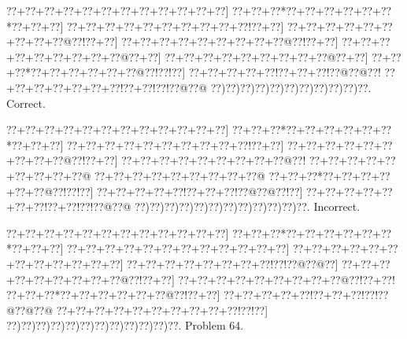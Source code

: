 \documentclass[a5paper]{article}
\begin{document}
\begin{center}
{\goo
\0??+\0??+\0??+\0??+\0??+\0??+\0??+\0??+\0??+\0??+\0??+\0??]
\0??+\0??+\0??*\0??+\0??+\0??+\0??+\0??+\0??*\0??+\0??+\0??]
\0??+\0??+\0??+\0??+\0??+\0??+\0??+\0??+\0??+\0??!\0??+\0??]
\0??+\0??+\0??+\0??+\0??+\0??+\0??+\0??+\0??@\0??!\0??+\0??]
\0??+\0??+\0??+\0??+\0??+\0??+\0??+\0??+\0??@\0??!\0??+\0??]
\0??+\0??+\0??+\0??+\0??+\0??+\0??+\0??+\0??@\0??+\0??]
\0??+\0??+\0??+\0??+\0??+\0??+\0??+\0??+\0??@\0??+\0??]
\0??+\0??+\0??*\0??+\0??+\0??+\0??+\0??+\0??@\0??!\0??!\0??]
\0??+\0??+\0??+\0??+\0??!\0??+\0??+\0??!\0??@\0??@\0??!
\0??+\0??+\0??+\0??+\0??+\0??+\0??!\0??+\0??!\0??!\0??@\0??@
\0??)\0??)\0??)\0??)\0??)\0??)\0??)\0??)\0??)\0??)\0??.
}
Correct. 

\end{center}
\begin{center}
{\goo
\0??+\0??+\0??+\0??+\0??+\0??+\0??+\0??+\0??+\0??+\0??+\0??]
\0??+\0??+\0??*\0??+\0??+\0??+\0??+\0??+\0??*\0??+\0??+\0??]
\0??+\0??+\0??+\0??+\0??+\0??+\0??+\0??+\0??+\0??!\0??+\0??]
\0??+\0??+\0??+\0??+\0??+\0??+\0??+\0??+\0??@\0??!\0??+\0??]
\0??+\0??+\0??+\0??+\0??+\0??+\0??+\0??+\0??@\0??!
\0??+\0??+\0??+\0??+\0??+\0??+\0??+\0??+\0??@
\0??+\0??+\0??+\0??+\0??+\0??+\0??+\0??+\0??@
\0??+\0??+\0??*\0??+\0??+\0??+\0??+\0??+\0??@\0??!\0??!\0??]
\0??+\0??+\0??+\0??+\0??!\0??+\0??+\0??!\0??@\0??@\0??!\0??]
\0??+\0??+\0??+\0??+\0??+\0??+\0??!\0??+\0??!\0??!\0??@\0??@
\0??)\0??)\0??)\0??)\0??)\0??)\0??)\0??)\0??)\0??)\0??)\0??.
}
Incorrect. 

\end{center}
\newpage
\begin{center}
{\goo
\0??+\0??+\0??+\0??+\0??+\0??+\0??+\0??+\0??+\0??+\0??+\0??]
\0??+\0??+\0??*\0??+\0??+\0??+\0??+\0??+\0??*\0??+\0??+\0??]
\0??+\0??+\0??+\0??+\0??+\0??+\0??+\0??+\0??+\0??+\0??+\0??]
\0??+\0??+\0??+\0??+\0??+\0??+\0??+\0??+\0??+\0??+\0??+\0??]
\0??+\0??+\0??+\0??+\0??+\0??+\0??+\0??!\0??!\0??@\0??@\0??]
\0??+\0??+\0??+\0??+\0??+\0??+\0??+\0??+\0??@\0??!\0??+\0??]
\0??+\0??+\0??+\0??+\0??+\0??+\0??+\0??+\0??@\0??!\0??+\0??!
\0??+\0??+\0??*\0??+\0??+\0??+\0??+\0??+\0??@\0??!\0??+\0??]
\0??+\0??+\0??+\0??+\0??!\0??+\0??+\0??!\0??!\0??@\0??@\0??@
\0??+\0??+\0??+\0??+\0??+\0??+\0??+\0??+\0??+\0??!\0??!\0??]
\0??)\0??)\0??)\0??)\0??)\0??)\0??)\0??)\0??)\0??)\0??)\0??.
}
Problem 64.

\end{center}
\end{document}
